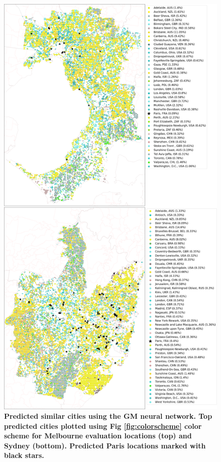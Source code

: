\documentclass[10pt,letterpaper]{article}
\begin{document}
\begin{figure}[!htbp]
\centering   
\includegraphics[scale=0.16]{Images/PlosOne/Fig6.png}  
\caption{\bf Predicted similar cities using the GM neural network. Top predicted cities plotted using Fig \ref{fig:colorscheme} color scheme for Melbourne evaluation locations (top) and Sydney (bottom). Predicted Paris locations marked with black stars.}    
 \label{fig:melmaps}  
\end{figure} 
\end{document}

